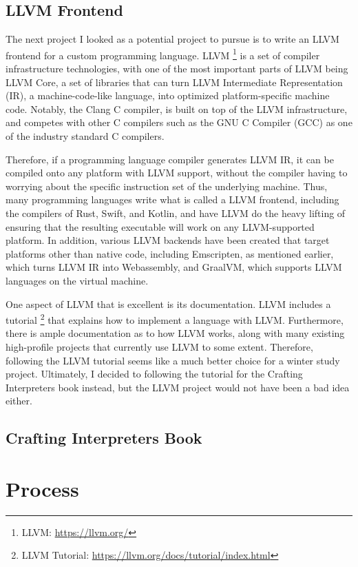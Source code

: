 \documentclass[tikz]{article}
\renewcommand{\:}{\colon}
\begin{document}
\subsection*{LLVM Frontend}
The next project I looked as a potential project to pursue is to write an LLVM frontend for a custom programming language. LLVM \footnote{LLVM: \url{https://llvm.org/}} is a set of compiler infrastructure technologies, with one of the most important parts of LLVM being LLVM Core, a set of libraries that can turn LLVM Intermediate Representation (IR), a machine-code-like language, into optimized platform-specific machine code. Notably, the Clang C compiler, is built on top of the LLVM infrastructure, and competes with other C compilers such as the GNU C Compiler (GCC) as one of the industry standard C compilers.

Therefore, if a programming language compiler generates LLVM IR, it can be compiled onto any platform with LLVM support, without the compiler having to worrying about the specific instruction set of the underlying machine. Thus, many programming languages write what is called a LLVM frontend, including the compilers of Rust, Swift, and Kotlin, and have LLVM do the heavy lifting of ensuring that the resulting executable will work on any LLVM-supported platform. In addition, various LLVM backends have been created that target platforms other than native code, including Emscripten, as mentioned earlier, which turns LLVM IR into Webassembly, and GraalVM, which supports LLVM languages on the virtual machine.

One aspect of LLVM that is excellent is its documentation. LLVM includes a tutorial \footnote{LLVM Tutorial: \url{https://llvm.org/docs/tutorial/index.html}} that explains how to implement a language with LLVM. Furthermore, there is ample documentation as to how LLVM works, along with many existing high-profile projects that currently use LLVM to some extent. Therefore, following the LLVM tutorial seems like a much better choice for a winter study project. Ultimately, I decided to following the tutorial for the Crafting Interpreters book instead, but the LLVM project would not have been a bad idea either.

\subsection*{Crafting Interpreters Book}

\section*{Process}
\end{document}
